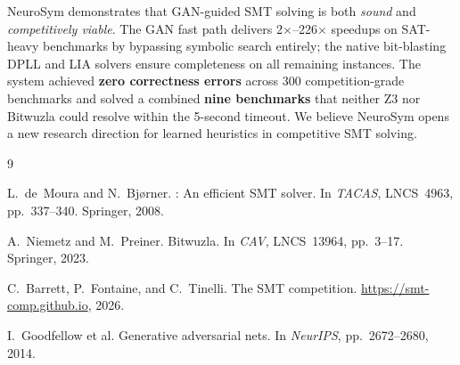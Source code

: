 \documentclass[10pt,a4paper]{article}
\begin{document}
NeuroSym demonstrates that GAN-guided SMT solving is both \emph{sound} and
\emph{competitively viable}.  The GAN fast path delivers 2$\times$--226$\times$
speedups on SAT-heavy benchmarks by bypassing symbolic search entirely;
the native bit-blasting DPLL and LIA solvers ensure completeness on all
remaining instances.  The system achieved \textbf{zero correctness errors}
across 300 competition-grade benchmarks and solved a combined \textbf{nine
benchmarks} that neither Z3 nor Bitwuzla could resolve within the 5-second
timeout.  We believe NeuroSym opens a new research direction for learned
heuristics in competitive SMT solving.


\begin{thebibliography}{9}

L.~de~Moura and N.~Bj\o{}rner.
: An efficient {SMT} solver.
\newblock In \emph{TACAS}, LNCS~4963, pp.~337--340. Springer, 2008.

A.~Niemetz and M.~Preiner.
\newblock Bitwuzla.
\newblock In \emph{CAV}, LNCS~13964, pp.~3--17. Springer, 2023.

C.~Barrett, P.~Fontaine, and C.~Tinelli.
\newblock The {SMT} competition.
\newblock \url{https://smt-comp.github.io}, 2026.

I.~Goodfellow et al.
\newblock Generative adversarial nets.
\newblock In \emph{NeurIPS}, pp.~2672--2680, 2014.

\end{thebibliography}
\end{document}
